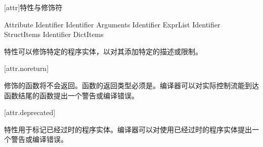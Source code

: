 
[attr]{特性与修饰符}

\begin{bnf}{Attribute}
     Identifier \br
     Identifier \terminal{(} Arguments\bnfq \terminal{)} \br
     Identifier \terminal{[} ExprList\bnfq \terminal{]} \br
     Identifier \terminal{\{} StructItems\bnfq \terminal{\}} \br
     Identifier \terminal{\{|} DictItems\bnfq \terminal{|\}}
\end{bnf}

\pnum
特性可以修饰特定的程序实体，以对其添加特定的描述或限制。

[attr.noreturn]{}

\pnum
{}修饰的函数将不会返回。函数的返回类型必须是。编译器可以对实际控制流能到达函数结尾的函数提出一个警告或编译错误。

[attr.deprecated]{}

\pnum
{}特性用于标记已经过时的程序实体。编译器可以对使用已经过时的程序实体提出一个警告或编译错误。
